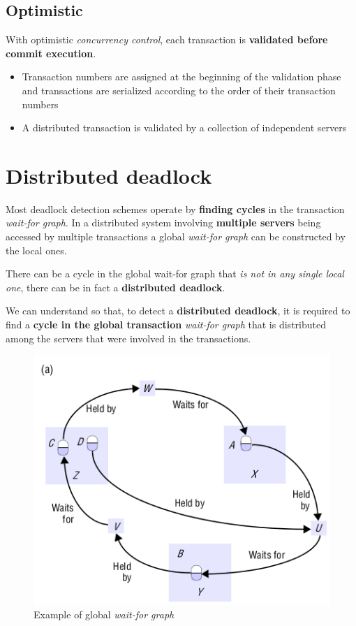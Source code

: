 \subsection{Optimistic}
With optimistic \textit{concurrency control}, each transaction is \textbf{validated before commit execution}.
\begin{itemize}
    \item  Transaction numbers are assigned at the beginning of the validation phase and transactions are serialized according to the order of their transaction numbers
    \item A distributed transaction is validated by a collection of independent servers
\end{itemize}

\section{Distributed deadlock}
Most deadlock detection schemes operate by \textbf{finding cycles} in the transaction \textit{wait-for graph}. In a distributed system involving \textbf{multiple servers} being accessed by multiple transactions a global \textit{wait-for graph} can be constructed by the local ones.

There can be a cycle in the global wait-for graph that \textit{is not in any single local one}, there can be in fact a \textbf{distributed deadlock}.

We can understand so that, to detect a \textbf{distributed deadlock}, it is required to find a \textbf{cycle in the global transaction} \textit{wait-for graph} that is distributed among the servers that were involved in the transactions.
\newpage
\begin{figure}[!h]
    \centering
    \includegraphics[width=.60\linewidth]{images/DistributedTransactions/distributedDeadlock.png}
    \caption{Example of global \textit{wait-for graph}}
\end{figure}

